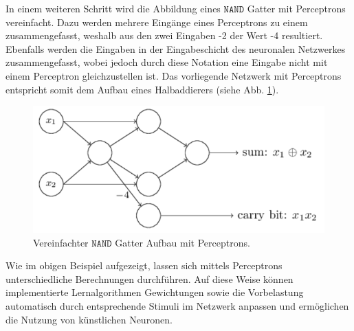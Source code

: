 \noindent
In einem weiteren Schritt wird die Abbildung eines $\mathtt{NAND}$ Gatter mit Perceptrons vereinfacht. Dazu werden mehrere Eingänge eines Perceptrons zu einem zusammengefasst, weshalb aus den zwei Eingaben -2 der Wert -4 resultiert. Ebenfalls werden die Eingaben in der Eingabeschicht des neuronalen Netzwerkes zusammengefasst, wobei jedoch durch diese Notation eine Eingabe nicht mit einem Perceptron gleichzustellen ist. Das vorliegende Netzwerk mit Perceptrons entspricht somit dem Aufbau eines Halbaddierers (siehe Abb. \ref{fig:nand_gatter_perceptron_simplified}). \\
\begin{figure}[hbt]
	\centering
	\includegraphics[scale=0.6]{Bilder/nand_gatter_perceptron_simplified}
	\caption{Vereinfachter $\mathtt{NAND}$ Gatter Aufbau mit Perceptrons.} 
	\label{fig:nand_gatter_perceptron_simplified} 
\end{figure}

\noindent
Wie im obigen Beispiel aufgezeigt, lassen sich mittels Perceptrons unterschiedliche Berechnungen durchführen. Auf diese Weise können implementierte Lernalgorithmen Gewichtungen sowie die Vorbelastung automatisch durch entsprechende Stimuli im Netzwerk anpassen und ermöglichen die Nutzung von künstlichen Neuronen.

